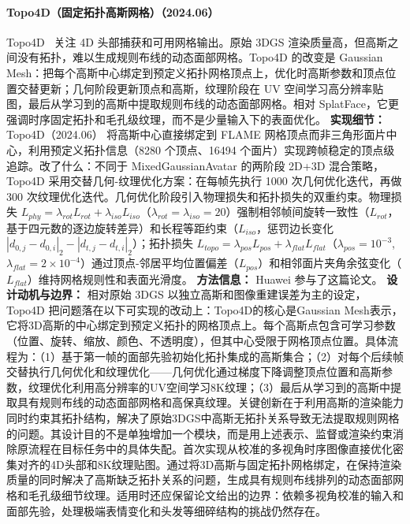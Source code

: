 \paragraph{Topo4D（固定拓扑高斯网格）（2024.06）}
Topo4D~\cite{2406_00440} 关注 4D 头部捕获和可用网格输出。原始 3DGS 渲染质量高，但高斯之间没有拓扑，难以生成规则布线的动态面部网格。Topo4D 的改变是 Gaussian Mesh：把每个高斯中心绑定到预定义拓扑网格顶点上，优化时高斯参数和顶点位置交替更新；几何阶段更新顶点和高斯，纹理阶段在 UV 空间学习高分辨率贴图，最后从学习到的高斯中提取规则布线的动态面部网格。相对 SplatFace，它更强调时序固定拓扑和毛孔级纹理，而不是少量输入下的表面优化。
\textbf{实现细节：} Topo4D（2024.06） 将高斯中心直接绑定到 FLAME 网格顶点而非三角形面片中心，利用预定义拓扑信息（8280 个顶点、16494 个面片）实现跨帧稳定的顶点级追踪。改了什么：不同于 MixedGaussianAvatar 的两阶段 2D+3D 混合策略，Topo4D 采用交替几何-纹理优化方案：在每帧先执行 1000 次几何优化迭代，再做 300 次纹理优化迭代。几何优化阶段引入物理损失和拓扑损失的双重约束。物理损失 $L_{phy} = \lambda_{rot} L_{rot} + \lambda_{iso} L_{iso}$（$\lambda_{rot}=\lambda_{iso}=20$）强制相邻帧间旋转一致性（$L_{rot}$，基于四元数的逐边旋转差异）和长程等距约束（$L_{iso}$，惩罚边长变化 $|d_{0,j} - d_{0,i}|_2 - |d_{t,j} - d_{t,i}|_2$）；拓扑损失 $L_{topo} = \lambda_{pos} L_{pos} + \lambda_{flat} L_{flat}$（$\lambda_{pos}=10^{-3}$, $\lambda_{flat}=2 \times 10^{-4}$）通过顶点-邻居平均位置偏差（$L_{pos}$）和相邻面片夹角余弦变化（$L_{flat}$）维持网格规则性和表面光滑度。
\textbf{方法信息：} Huawei 参与了这篇论文。
\textbf{设计动机与边界：} 相对原始 3DGS 以独立高斯和图像重建误差为主的设定，Topo4D 把问题落在以下可实现的改动上：Topo4D的核心是Gaussian Mesh表示，它将3D高斯的中心绑定到预定义拓扑的网格顶点上。每个高斯点包含可学习参数（位置、旋转、缩放、颜色、不透明度），但其中心受限于网格顶点位置。具体流程为：（1）基于第一帧的面部先验初始化拓扑集成的高斯集合；（2）对每个后续帧交替执行几何优化和纹理优化——几何优化通过梯度下降调整顶点位置和高斯参数，纹理优化利用高分辨率的UV空间学习8K纹理；（3）最后从学习到的高斯中提取具有规则布线的动态面部网格和高保真纹理。关键创新在于利用高斯的渲染能力同时约束其拓扑结构，解决了原始3DGS中高斯无拓扑关系导致无法提取规则网格的问题。其设计目的不是单独增加一个模块，而是用上述表示、监督或渲染约束消除原流程在目标任务中的具体失配。首次实现从校准的多视角时序图像直接优化密集对齐的4D头部和8K纹理贴图。通过将3D高斯与固定拓扑网格绑定，在保持渲染质量的同时解决了高斯缺乏拓扑关系的问题，生成具有规则布线排列的动态面部网格和毛孔级细节纹理。适用时还应保留论文给出的边界：依赖多视角校准的输入和面部先验，处理极端表情变化和头发等细碎结构的挑战仍然存在。
